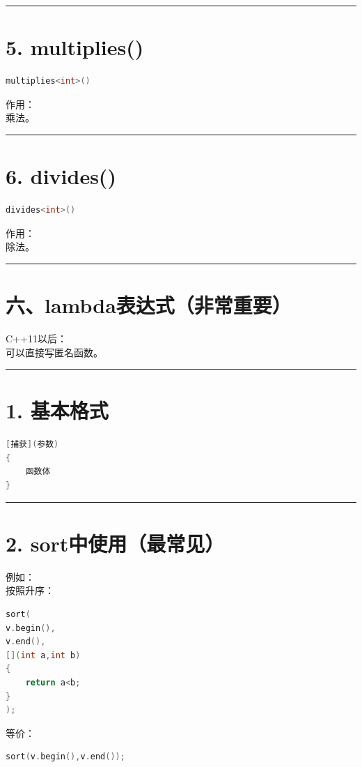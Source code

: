 \documentclass[9pt,twocolumn]{extarticle}
\begin{document}
\noindent\rule{\linewidth}{0.4pt}

\section{5. multiplies()}
\begin{lstlisting}[language=C++]
multiplies<int>()
\end{lstlisting}
作用：\\
乘法。

\noindent\rule{\linewidth}{0.4pt}

\section{6. divides()}
\begin{lstlisting}[language=C++]
divides<int>()
\end{lstlisting}
作用：\\
除法。

\noindent\rule{\linewidth}{0.4pt}

\section{六、lambda表达式（非常重要）}

C++11以后：\\
可以直接写匿名函数。

\noindent\rule{\linewidth}{0.4pt}

\section{1. 基本格式}
\begin{lstlisting}[language=C++]
[捕获](参数)
{
    函数体
}
\end{lstlisting}

\noindent\rule{\linewidth}{0.4pt}

\section{2. sort中使用（最常见）}
例如：\\
按照升序：
\begin{lstlisting}[language=C++]
sort(
v.begin(),
v.end(),
[](int a,int b)
{
    return a<b;
}
);
\end{lstlisting}
等价：
\begin{lstlisting}[language=C++]
sort(v.begin(),v.end());
\end{lstlisting}
\end{document}
